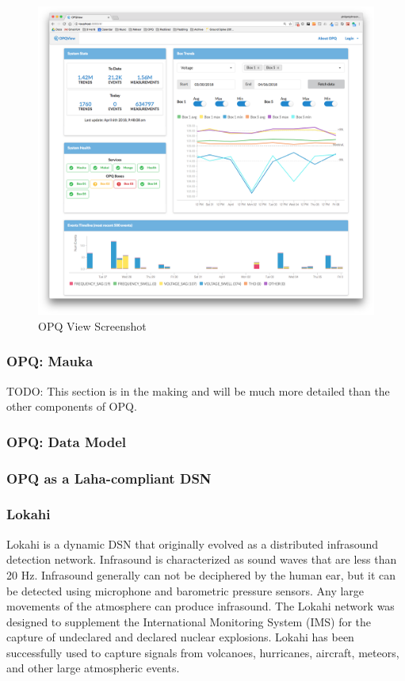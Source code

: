\begin{figure}
	\centering
	\includegraphics[width=1\linewidth]{figures/opqview-landing-page.png}
	\caption{OPQ View Screenshot}\label{fig:opq-view}
\end{figure}

\subsubsection{OPQ: Mauka}

TODO: This section is in the making and will be much more detailed than the other components of OPQ.

\subsubsection{OPQ: Data Model}

\subsubsection{OPQ as a Laha-compliant DSN}

\subsubsection{Lokahi}
Lokahi is a dynamic DSN that originally evolved as a distributed infrasound detection network. Infrasound is characterized as sound waves that are less than 20 Hz. Infrasound generally can not be deciphered by the human ear, but it can be detected using microphone and barometric pressure sensors. Any large movements of the atmosphere can produce infrasound. The Lokahi network was designed to supplement the International Monitoring System (IMS) for the capture  of undeclared and declared nuclear explosions. Lokahi has been successfully used to capture signals from volcanoes, hurricanes, aircraft, meteors, and other large atmospheric events. 

